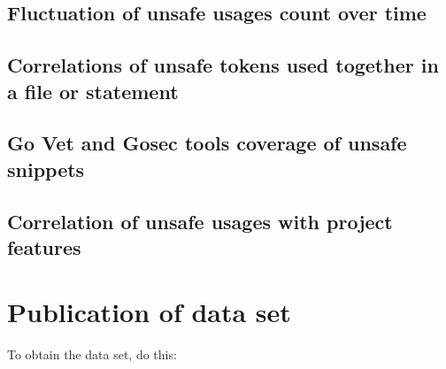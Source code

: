 \subsection{Fluctuation of unsafe usages count over time}\label{subsec:results-time-change}


\subsection{Correlations of unsafe tokens used together in a file or statement}\label{subsec:results-correlation-together}


\subsection{Go Vet and Gosec tools coverage of unsafe snippets}\label{subsec:results-vet-gosec}


\subsection{Correlation of unsafe usages with project features}\label{subsec:results-correlation-project}



\section{Publication of data set}\label{sec:survey-publication}

To obtain the data set, do this:

